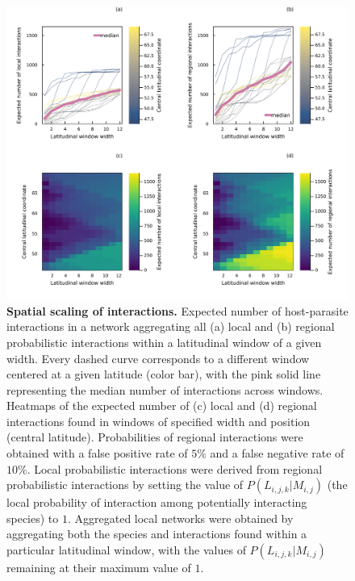 \begin{figure}[!h]
  \centering
  \includegraphics[width=\textwidth]{figures/article1/spatial_scaling.png}
  \caption{\textbf{Spatial scaling of interactions.}
  Expected number of host-parasite interactions in a network aggregating all (a)
  local and (b) regional probabilistic interactions within a latitudinal window
  of a given width. Every dashed curve corresponds to a different window
  centered at a given latitude (color bar), with the pink solid line
  representing the median number of interactions across windows. Heatmaps of the
  expected number of (c) local and (d) regional interactions found in windows of
  specified width and position (central latitude). Probabilities of regional
  interactions were obtained with a false positive rate of $5\%$ and a false
  negative rate of $10\%$. Local probabilistic interactions were derived from
  regional probabilistic interactions by setting the value of $P(L_{i, j,
  k}|M_{i,j})$ (the local probability of interaction among potentially
  interacting species) to $1$. Aggregated local networks were obtained by
  aggregating both the species and interactions found within a particular
  latitudinal window, with the values of $P(L_{i, j, k}|M_{i, j})$ remaining at
  their maximum value of $1$.}
  \label{fig:spatial}
\end{figure}

\clearpage


